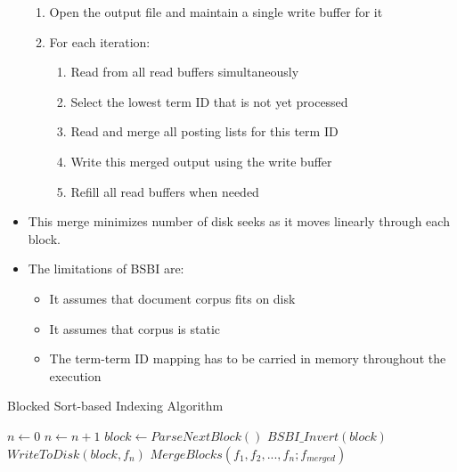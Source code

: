 \documentclass{article}
\begin{document}
\begin{itemize}
\begin{enumerate}
        \item Open the output file and maintain a single write buffer for it
        
        \item For each iteration:
        \begin{enumerate}
            \item Read from all read buffers simultaneously
            
            \item Select the lowest term ID that is not yet processed
            
            \item Read and merge all posting lists for this term ID
            
            \item Write this merged output using the write buffer
            
            \item Refill all read buffers when needed
        \end{enumerate}
    \end{enumerate}
    
    \item This merge minimizes number of disk seeks as it moves linearly through each block. 
    
    \item The limitations of BSBI are:
    \begin{itemize}
        \item It assumes that document corpus fits on disk
        
        \item It assumes that corpus is static
        
        \item The term-term ID mapping has to be carried in memory throughout the execution
    \end{itemize}
\end{itemize}

\begin{algorithm}[!t]
\caption{Blocked Sort-based Indexing Algorithm}
\begin{algorithmic}
    \State $n \leftarrow 0$
        \State $n \leftarrow n+1$
        \State $block \leftarrow ParseNextBlock()$
        \State $BSBI\_Invert(block)$
        \State $WriteToDisk(block, f_n)$
    \EndWhile
    \State $MergeBlocks(f_1, f_2, ..., f_n; f_{merged})$
    \EndProcedure
\end{algorithmic}
\end{algorithm}
\end{document}

